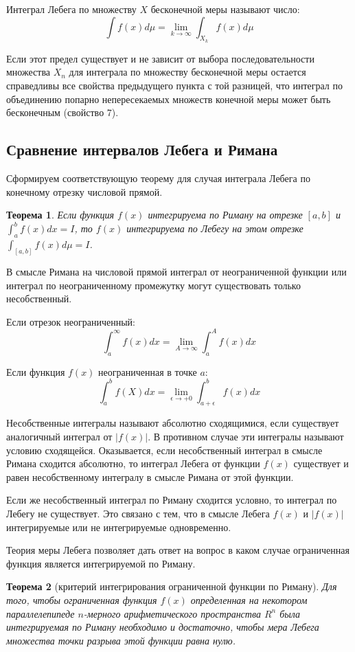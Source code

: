 \documentclass[14pt,a4paper]{extarticle}
\newtheorem{theorem}{Теорема}[section]
\theoremstyle{definition}
\theoremstyle{remark}
\renewcommand{\[}{\begin{dmath*}[compact]}
\renewcommand{\]}{\end{dmath*}}
\newcommand{\ds}{\displaystyle}
\begin{document}
Интеграл Лебега по множеству $X$ бесконечной меры называют число:
\[\int f(x) d\mu = \lim_{k \to \infty} \int_{X_k}f(x) d \mu\]

Если этот предел существует и не зависит от выбора последовательности множества
$X_n$ для интеграла по множеству бесконечной меры остается справедливы
все свойства предыдущего пункта с той разницей, что интеграл по объединению
попарно непересекаемых множеств конечной меры может быть
бесконечным (свойство 7).

\subsection{Сравнение интервалов Лебега и Римана}

Сформируем соответствующую теорему для случая интеграла Лебега
по конечному отрезку числовой прямой.

\begin{theorem}
  Если функция $f(x)$ интегрируема по Риману на отрезке $[a,b]$ и
  $\ds\int_a^b f(x) dx = I$, то $f(x)$ интегрируема по Лебегу на этом отрезке
  $\ds\int_{[a,b]} f(x) d \mu = I$.
\end{theorem}

В смысле Римана на числовой прямой интеграл от неограниченной функции
или интеграл по неограниченному промежутку могут существовать
только несобственный.

Если отрезок неограниченный:
\[\int_a^\infty f(x)dx = \lim_{A \to \infty} \int_a^A f(x) dx\]

Если функция $f(x)$ неограниченная в точке $a$:
\[\int_a^b f(X)dx = \lim_{\epsilon \to +0} \int_{a+\epsilon}^b f(x) dx\]

Несобственные интегралы называют абсолютно сходящимися,
если существует аналогичный интеграл от $|f(x)|$.
В противном случае эти интегралы называют условию сходящейся.
Оказывается, если несобственный интеграл в смысле Римана сходится абсолютно,
то интеграл Лебега от функции $f(x)$ существует и равен несобственному
интегралу в смысле Римана от этой функции.

Если же несобственный интеграл по Риману сходится условно,
то интеграл по Лебегу не существует.
Это связано с тем, что в смысле Лебега $f(x)$ и $|f(x)|$ интегрируемые
или не интегрируемые одновременно.

Теория меры Лебега позволяет дать ответ на вопрос в каком случае
ограниченная функция является интегрируемой по Риману.

\begin{theorem}[критерий интегрирования ограниченной функции по Риману]
  Для того, чтобы ограниченная функция $f(x)$ определенная на некотором
  параллелепипеде $n$-мерного арифметического пространства $R^n$ была
  интегрируемая по Риману необходимо и достаточно,
  чтобы мера Лебега множества точки разрыва этой функции равна нулю.
\end{theorem}
\end{document}
